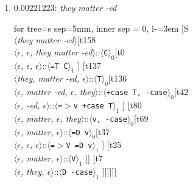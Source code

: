 \documentclass[11pt]{article}
\begin{document}
\begin{enumerate}
	\item  0.00221223: \textit{they matter -ed} \\[0.5em]
	\begin{forest}
	for tree={s sep=5mm, inner sep = 0, l-=3em}
	[S\\$\langle$\textit{they matter -ed}$\rangle$[t158\\$\langle$\textit{$\epsilon${,} $\epsilon${,} they matter -ed}$\rangle$::$\langle$\texttt{C}$\rangle_0$[t0\\$\langle$\textit{$\epsilon${,} $\epsilon${,} $\epsilon$}$\rangle$::$\langle$\texttt{{=}T C}$\rangle_1$ ] [t137\\$\langle$\textit{they{,} matter -ed{,} $\epsilon$}$\rangle$::$\langle$\texttt{T}$\rangle_0$[t136\\$\langle$\textit{$\epsilon${,} matter -ed{,} $\epsilon${,} they}$\rangle$::$\langle$\texttt{+case T{,} -case}$\rangle_0$[t42\\$\langle$\textit{$\epsilon${,} -ed{,} $\epsilon$}$\rangle$::$\langle$\texttt{{=}$>$v +case T}$\rangle_1$ ] [t80\\$\langle$\textit{$\epsilon${,} matter{,} $\epsilon${,} they}$\rangle$::$\langle$\texttt{v{,} -case}$\rangle_0$[t69\\$\langle$\textit{$\epsilon${,} matter{,} $\epsilon$}$\rangle$::$\langle$\texttt{{=}D v}$\rangle_0$[t37\\$\langle$\textit{$\epsilon${,} $\epsilon${,} $\epsilon$}$\rangle$::$\langle$\texttt{{=}$>$V {=}D v}$\rangle_1$ ] [t25\\$\langle$\textit{$\epsilon${,} matter{,} $\epsilon$}$\rangle$::$\langle$\texttt{V}$\rangle_1$ ]] [t7\\$\langle$\textit{$\epsilon${,} they{,} $\epsilon$}$\rangle$::$\langle$\texttt{D -case}$\rangle_1$ ]]]]]]
	\end{forest}
	\newpage


\end{enumerate}
\end{document}
